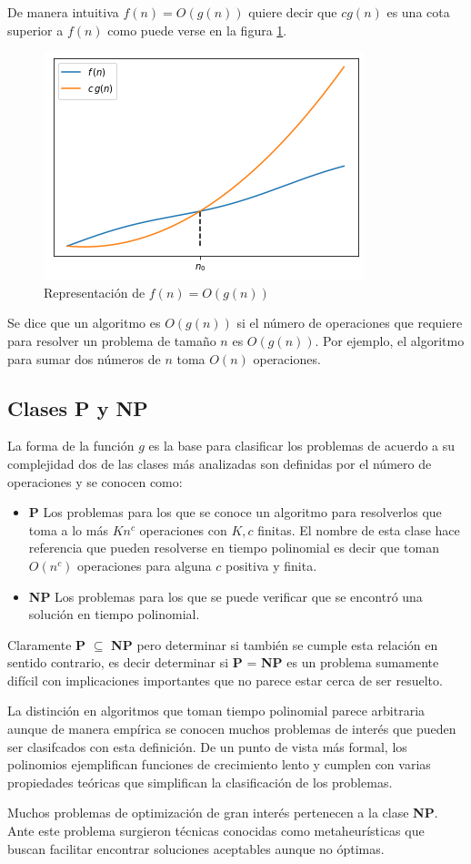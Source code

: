 De manera intuitiva $f(n)=O(g(n))$ quiere decir que $cg(n)$ es una cota superior a $f(n)$ como puede verse en la figura \ref{fig:bigo}.
\begin{figure}[H]
    \centering
    \includegraphics[scale=.8]{Imagenes/bigo.png}
    \caption{Representación de $f(n)= O(g(n))$}
    \label{fig:bigo}
\end{figure}
Se dice que un algoritmo es $O(g(n))$ si el número de operaciones que requiere para resolver un problema de tamaño $n$ es $O(g(n))$. Por ejemplo, el algoritmo para sumar dos números de $n$ toma $O(n)$ operaciones. 

\subsection*{Clases \textbf{P} y \textbf{NP}}
La forma de la función $g$ es la base para clasificar los problemas de acuerdo a su complejidad dos de las clases más analizadas son definidas por el número de operaciones y se conocen como:
\begin{itemize} 
    \item \textbf{P} Los problemas para los que se conoce un algoritmo para resolverlos que toma a lo más $Kn^c$ operaciones con $K,c$ finitas. El nombre de esta clase hace referencia que pueden resolverse en tiempo polinomial es decir que toman $O(n^c)$ operaciones para alguna $c$ positiva y finita.
    \item \textbf{NP} Los problemas para los que se puede verificar que se encontró una solución en tiempo polinomial.
\end{itemize}

Claramente \textbf{P} $\subseteq$ \textbf{NP} pero determinar si también se cumple esta relación en sentido contrario, es decir determinar si \textbf{P} = \textbf{NP} es un problema sumamente difícil con implicaciones importantes que no parece estar cerca de ser resuelto.

La distinción en algoritmos que toman tiempo polinomial parece arbitraria aunque de manera empírica se conocen muchos problemas de interés que pueden ser clasifcados con esta definición. De un punto de vista más formal, los polinomios ejemplifican funciones de crecimiento lento y cumplen con varias propiedades teóricas que simplifican la clasificación de los problemas\cite{wigderson2006p}.

Muchos problemas de optimización de gran interés pertenecen a la clase \textbf{NP}. Ante este problema surgieron técnicas conocidas como metaheurísticas que buscan facilitar encontrar soluciones aceptables aunque no óptimas.

